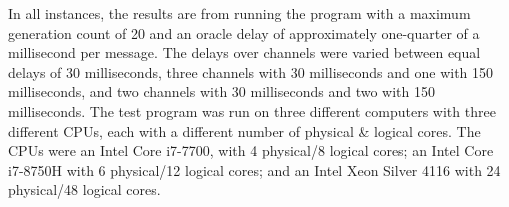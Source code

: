 In all instances, the results are from running the program with a maximum generation count of 20 and an oracle delay of approximately one-quarter of a millisecond per message.  The delays over channels were varied between equal delays of 30 milliseconds, three channels with 30 milliseconds and one with 150 milliseconds, and two channels with 30 milliseconds and two with 150 milliseconds.  The test program was run on three different computers with three different CPUs, each with a different number of physical \& logical cores.  The CPUs were an Intel\textsuperscript{\textregistered} Core\textsuperscript{\texttrademark} i7-7700, with 4 physical/8 logical cores; an Intel\textsuperscript{\textregistered} Core\textsuperscript{\texttrademark} i7-8750H with 6 physical/12 logical cores; and an Intel\textsuperscript{\textregistered} Xeon\textsuperscript{\textregistered} Silver 4116 with 24 physical/48 logical cores.

\begin{table}
\centering
{}
\caption[Mean recorded running times for each  variant on an 8-core CPU]{Mean recorded running times in milliseconds for each \gls{nmp} variant in a simulation, with different sending delay lengths, on a computer with a CPU with 4/8 physical/logical cores}
\label{tab:nmp:simulation8cores}
\end{table}

